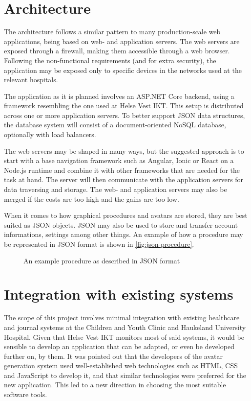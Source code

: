 \section{Architecture}

The architecture follows a similar pattern to many production-scale web applications, being based on web- and application servers. The web servers are exposed through a firewall, making them accessible through a web browser. Following the non-functional requirements (and for extra security), the application may be exposed only to specific devices in the networks used at the relevant hospitals.

The application as it is planned involves an ASP.NET Core backend, using a framework resembling the one used at Helse Vest IKT. This setup is distributed across one or more application servers. To better support JSON data structures, the database system will consist of a document-oriented NoSQL database, optionally with load balancers.

The web servers may be shaped in many ways, but the suggested approach is to start with a base navigation framework such as Angular, Ionic or React on a Node.js runtime and combine it with other frameworks that are needed for the task at hand. The server will then communicate with the application servers for data traversing and storage. The web- and application servers may also be merged if the costs are too high and the gains are too low.

When it comes to how graphical procedures and avatars are stored, they are best suited as JSON objects. JSON may also be used to store and transfer account informations, settings among other things. An example of how a procedure may be represented in JSON format is shown in \autoref{fig:json-procedure}.

\begin{figure}
    
    \caption{An example procedure as described in JSON format}
    \label{fig:json-procedure}
\end{figure}

\section{Integration with existing systems}
\label{sec:integration}

The scope of this project involves minimal integration with existing healthcare and journal systems at the Children and Youth Clinic and Haukeland University Hospital. Given that Helse Vest IKT monitors most of said systems, it would be sensible to develop an application that can be adapted, or even be developed further on, by them. It was pointed out that the developers of the avatar generation system used well-established web technologies such as HTML, CSS and JavaScript to develop it, and that similar technologies were preferred for the new application. This led to a new direction in choosing the most suitable software tools.

